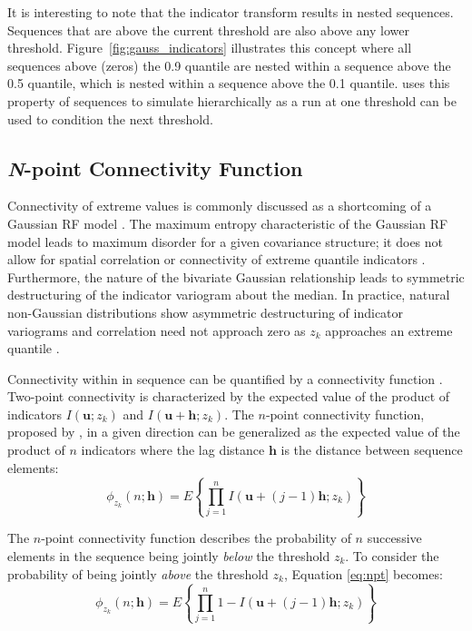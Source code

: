 It is interesting to note that the indicator transform results in nested sequences. Sequences that are above the current threshold are also above any lower threshold. Figure~\ref{fig:gauss_indicators} illustrates this concept where all sequences above (zeros) the 0.9 quantile are nested within a sequence above the 0.5 quantile, which is nested within a sequence above the 0.1 quantile. \cite{ortiz2003characterization} uses this property of sequences to simulate hierarchically as a run at one threshold can be used to condition the next threshold.

\FloatBarrier
\subsection{\textit{N}-point Connectivity Function}
\label{subsec:03npoint}

Connectivity of extreme values is commonly discussed as a shortcoming of a Gaussian \gls{RF} model \citep{journel1993entropy,journel1989nongaussian}. The maximum entropy characteristic of the Gaussian \gls{RF} model leads to maximum disorder for a given covariance structure; it does not allow for spatial correlation or connectivity of extreme quantile indicators \citep{journel1989nongaussian}. Furthermore, the nature of the bivariate Gaussian relationship leads to symmetric destructuring of the indicator variogram about the median. In practice, natural non-Gaussian distributions show asymmetric destructuring of indicator variograms \citep{vincent2021multipleindicator} and correlation need not approach zero as $z_{k}$ approaches an extreme quantile \citep{journel1989nongaussian}.

Connectivity within in sequence can be quantified by a connectivity function \citep{renard2011conditioning}. Two-point connectivity is characterized by the expected value of the product of indicators $I(\mathbf{u}; z_{k})$ and $I(\mathbf{u}+\mathbf{h}; z_{k})$. The $n\text{-point}$ connectivity function, proposed by \cite{journel1989nongaussian}, in a given direction can be generalized as the expected value of the product of $n$ indicators where the lag distance $\mathbf{h}$ is the distance between sequence elements:
\begin{equation}
    \phi_{z_{k}}(n;\mathbf{h}) = E\left\{\prod_{j=1}^{n} I(\mathbf{u} + (j-1)\mathbf{h}; z_{k})\right\}
    \label{eq:npt}
\end{equation}

The $n\text{-point}$ connectivity function describes the probability of $n$ successive elements in the sequence being jointly \emph{below} the threshold $z_{k}$. To consider the probability of being jointly \emph{above} the threshold $z_{k}$, Equation \ref{eq:npt} becomes:
\begin{equation}
    \phi_{z_{k}}(n;\mathbf{h}) = E\left\{\prod_{j=1}^{n} 1 - I(\mathbf{u} + (j-1)\mathbf{h}; z_{k})\right\}
    \label{eq:npt2}
\end{equation}


